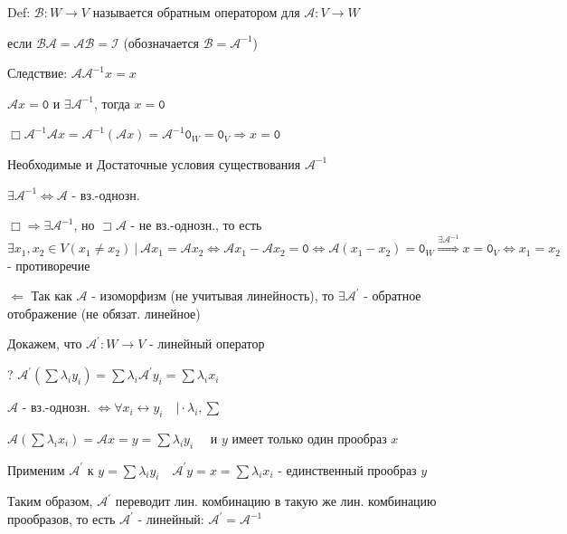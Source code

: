 \documentclass[12pt]{article}
\begin{document}
    Def: $\mathcal{B} : W \rightarrow V$ называется обратным оператором для $\mathcal{A} : V \rightarrow W$

    если $\mathcal{B}\mathcal{A} = \mathcal{A}\mathcal{B} = \mathcal{I}$ (обозначается $\mathcal{B} = \mathcal{A}^{-1}$)

    Следствие: $\mathcal{A}\mathcal{A}^{-1} x = x$

    \Th $\mathcal{A}x = \texttt{0}$ и $\exists \mathcal{A}^{-1}$, тогда $x = \texttt{0}$

    $\Box \mathcal{A}^{-1}\mathcal{A} x = \mathcal{A}^{-1}(\mathcal{A} x) = \mathcal{A}^{-1} \texttt{0}_W = \texttt{0}_V \Longrightarrow x = \texttt{0}$

    \Th Необходимые и Достаточные условия существования $\mathcal{A}^{-1}$

    $\exists \mathcal{A}^{-1} \Longleftrightarrow \mathcal{A}$ - вз.-однозн.

    $\Box \Longrightarrow \exists \mathcal{A}^{-1}$, но $\sqsupset \mathcal{A}$ - не вз.-однозн., то есть
    $\exists x_1, x_2 \in V (x_1 \neq x_2) \ | \ \mathcal{A}x_1 = \mathcal{A}x_2 \Longleftrightarrow \mathcal{A}x_1 - \mathcal{A}x_2 = \texttt{0} \Longleftrightarrow
    \mathcal{A}(x_1 - x_2) = \texttt{0}_W \stackrel{\exists \mathcal{A}^{-1}}{\Longrightarrow} x = \texttt{0}_V \Longleftrightarrow x_1 = x_2$ - противоречие

    $\Longleftarrow$ Так как $\mathcal{A}$ - изоморфизм (не учитывая линейность), то $\exists \mathcal{A}^\prime$ - обратное отображение (не обязат. линейное)

    Докажем, что $\mathcal{A}^\prime : W \rightarrow V$ - линейный оператор

    ? $\mathcal{A}^\prime (\sum \lambda_i y_i) = \sum \lambda_i \mathcal{A}^\prime y_i = \sum \lambda_i x_i$

    $\mathcal{A}$ - вз.-однозн. $\Longleftrightarrow \forall x_i \longleftrightarrow y_i \quad \Big| \cdot \lambda_i, \sum$

    $\mathcal{A}(\sum \lambda_i x_i) = \mathcal{A} x = y = \sum \lambda_i y_i \quad$ и $y$ имеет только один прообраз $x$

    Применим $\mathcal{A}^\prime$ к $y = \sum \lambda_i y_i \quad \mathcal{A}^\prime y = x = \sum \lambda_i x_i$ - единственный прообраз $y$

    Таким образом, $\mathcal{A}^\prime$ переводит лин. комбинацию в такую же лин. комбинацию прообразов, то есть $\mathcal{A}^\prime$ - линейный: $\mathcal{A}^\prime = \mathcal{A}^{-1}$
\end{document}
